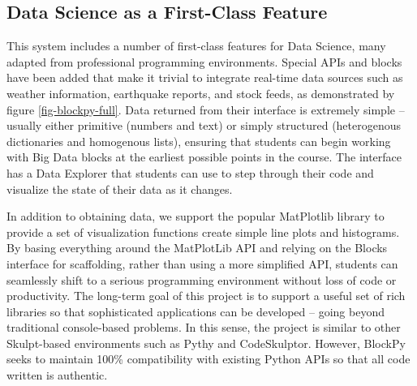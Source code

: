 \documentclass{sig-alternate}
\begin{document}
\subsection{Data Science as a First-Class Feature}

%

This system includes a number of first-class features for Data Science, many adapted from professional programming environments.
Special APIs and blocks have been added that make it trivial to integrate real-time data sources such as weather information, earthquake reports, and stock feeds, as demonstrated by figure \ref{fig-blockpy-full}.
Data returned from their interface is extremely simple -- usually either primitive (numbers and text) or simply structured (heterogenous dictionaries and homogenous lists), ensuring that students can begin working with Big Data blocks at the earliest possible points in the course.
The interface has a Data Explorer that students can use to step through their code and visualize the state of their data as it changes.

In addition to obtaining data, we support the popular MatPlotlib library to provide a set of visualization functions create simple line plots and histograms.
By basing everything around the MatPlotLib API and relying on the Blocks interface for scaffolding, rather than using a more simplified API, students can seamlessly shift to a serious programming environment without loss of code or productivity. 
The long-term goal of this project is to support a useful set of rich libraries so that sophisticated applications can be developed -- going beyond traditional console-based problems.
In this sense, the project is similar to other Skulpt-based environments such as Pythy and CodeSkulptor.
However, BlockPy seeks to maintain 100\% compatibility with existing Python APIs so that all code written is authentic.
\end{document}
